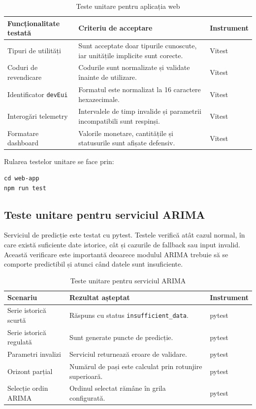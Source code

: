 \begin{table}[htbp]
\centering
\small
\begin{tabular}{|p{}|p{}|p{}|}
\hline
\textbf{Funcționalitate testată} & \textbf{Criteriu de acceptare} & \textbf{Instrument} \\
\hline
Tipuri de utilități & Sunt acceptate doar tipurile cunoscute, iar unitățile implicite sunt corecte. & Vitest \\
\hline
Coduri de revendicare & Codurile sunt normalizate și validate înainte de utilizare. & Vitest \\
\hline
Identificator \texttt{devEui} & Formatul este normalizat la 16 caractere hexazecimale. & Vitest \\
\hline
Interogări telemetry & Intervalele de timp invalide și parametrii incompatibili sunt respinși. & Vitest \\
\hline
Formatare dashboard & Valorile monetare, cantitățile și statusurile sunt afișate defensiv. & Vitest \\
\hline
\end{tabular}
\caption{Teste unitare pentru aplicația web}
\label{tab:teste-unitare-web}
\end{table}

Rularea testelor unitare se face prin:

\begin{verbatim}
cd web-app
npm run test
\end{verbatim}

\subsection{Teste unitare pentru serviciul ARIMA}

Serviciul de predicție este testat cu pytest. Testele verifică atât cazul normal, în care există suficiente date istorice, cât și cazurile de fallback sau input invalid. Această verificare este importantă deoarece modulul ARIMA trebuie să se comporte predictibil și atunci când datele sunt insuficiente.

\begin{table}[htbp]
\centering
\small
\begin{tabular}{|p{}|p{}|p{}|}
\hline
\textbf{Scenariu} & \textbf{Rezultat așteptat} & \textbf{Instrument} \\
\hline
Serie istorică scurtă & Răspuns cu status \texttt{insufficient\_data}. & pytest \\
\hline
Serie istorică regulată & Sunt generate puncte de predicție. & pytest \\
\hline
Parametri invalizi & Serviciul returnează eroare de validare. & pytest \\
\hline
Orizont parțial & Numărul de pași este calculat prin rotunjire superioară. & pytest \\
\hline
Selecție ordin ARIMA & Ordinul selectat rămâne în grila configurată. & pytest \\
\hline
\end{tabular}
\caption{Teste unitare pentru serviciul ARIMA}
\label{tab:teste-unitare-arima}
\end{table}


